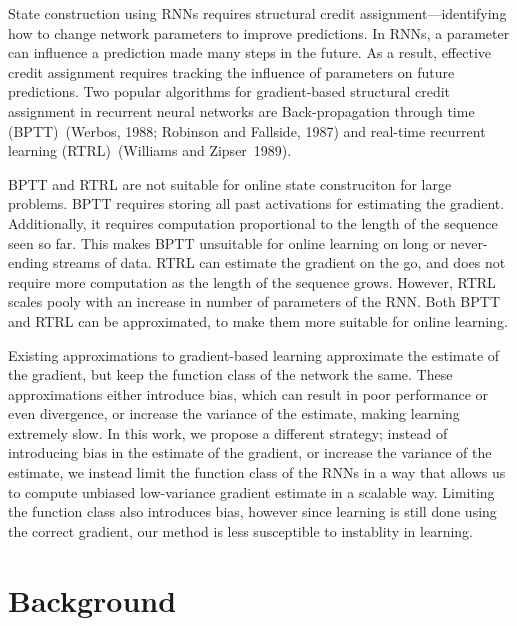 \documentclass[twoside,11pt]{article}
\begin{document}
State construction using RNNs requires structural credit assignment---identifying how to change network parameters to improve predictions. In RNNs, a parameter can influence  a prediction made many steps in the future. As a result, effective credit assignment requires tracking the influence of parameters on future predictions. Two popular algorithms for gradient-based structural credit assignment in recurrent neural networks are Back-propagation through time (BPTT)~(Werbos, 1988; Robinson and Fallside, 1987)  and real-time recurrent learning (RTRL)~(Williams and Zipser~1989). 

BPTT and RTRL are not suitable for online state construciton for large problems. BPTT requires storing all past activations for estimating the gradient. Additionally, it requires computation proportional to the length of the sequence seen so far. This makes BPTT unsuitable for online learning on long or never-ending streams of data. RTRL can estimate the gradient on the go, and does not require more computation as the length of the sequence grows. However, RTRL scales pooly with an increase in number of parameters of the RNN. Both BPTT and RTRL can be approximated, to make them more suitable for online learning. 

Existing approximations to gradient-based learning approximate the estimate of the gradient, but keep the function class of the network the same. These approximations either introduce bias, which can result in poor performance or even divergence, or increase the variance of the estimate, making learning extremely slow. In this work, we propose a different strategy; instead of introducing bias in the estimate of the gradient, or increase the variance of the estimate, we instead limit the function class of the RNNs in a way that allows us to compute unbiased low-variance gradient estimate in a scalable way. Limiting the function class also introduces bias, however since learning is still done using the correct gradient, our method is less susceptible to instablity in learning. 




\section{Background}
\end{document}
